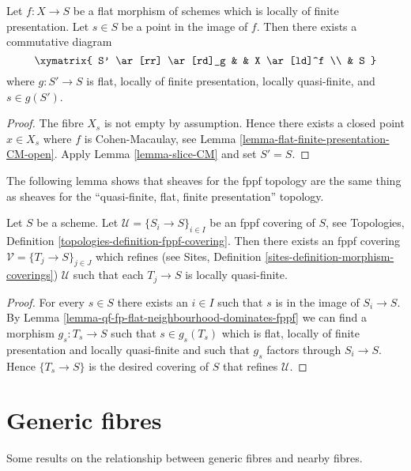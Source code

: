 \begin{lemma}
\label{lemma-qf-fp-flat-neighbourhood-dominates-fppf}
Let $f : X \to S$ be a flat morphism of schemes which is
locally of finite presentation. Let $s \in S$ be a point in the image of $f$.
Then there exists a commutative diagram
$$
\xymatrix{
S' \ar[rr] \ar[rd]_g & & X \ar[ld]^f \\
& S
}
$$
where $g : S' \to S$ is flat, locally of finite presentation,
locally quasi-finite, and $s \in g(S')$.
\end{lemma}

\begin{proof}
The fibre $X_s$ is not empty by assumption. Hence there exists a closed
point $x \in X_s$ where $f$ is Cohen-Macaulay, see
Lemma \ref{lemma-flat-finite-presentation-CM-open}.
Apply
Lemma \ref{lemma-slice-CM}
and set $S' = S$.
\end{proof}

\noindent
The following lemma shows that sheaves for the fppf topology are
the same thing as sheaves for the
``quasi-finite, flat, finite presentation'' topology.

\begin{lemma}
\label{lemma-qf-fp-flat-dominates-fppf}
Let $S$ be a scheme. Let $\mathcal{U} = \{S_i \to S\}_{i \in I}$ be an fppf
covering of $S$, see
Topologies, Definition \ref{topologies-definition-fppf-covering}.
Then there exists an fppf covering $\mathcal{V} = \{T_j \to S\}_{j \in J}$
which refines (see
Sites, Definition \ref{sites-definition-morphism-coverings})
$\mathcal{U}$ such that each $T_j \to S$ is locally quasi-finite.
\end{lemma}

\begin{proof}
For every $s \in S$ there exists an $i \in I$ such that $s$ is in
the image of $S_i \to S$. By
Lemma \ref{lemma-qf-fp-flat-neighbourhood-dominates-fppf}
we can find a morphism $g_s : T_s \to S$ such that $s \in g_s(T_s)$
which is flat, locally of finite presentation and locally quasi-finite
and such that $g_s$ factors through $S_i \to S$. Hence
$\{T_s \to S\}$ is the desired covering of $S$ that refines $\mathcal{U}$.
\end{proof}



\section{Generic fibres}
\label{section-generic}

\noindent
Some results on the relationship between generic fibres and
nearby fibres.

